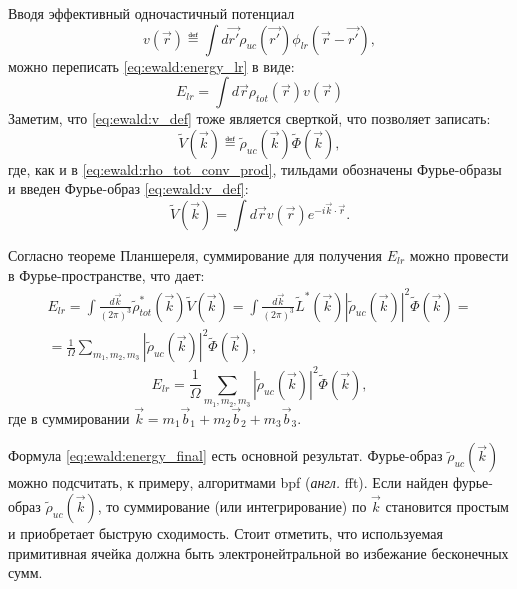 Вводя эффективный одночастичный потенциал
\begin{equation}
    \label{eq:ewald:v_def}
    v(\vec{r}) \eqdef \int d \vec{r'} \rho_{u c}\left(\vec{r'}\right) \phi_{lr}\left(\vec{r}-\vec{r'}\right),
\end{equation}
можно переписать \eqref{eq:ewald:energy_lr} в виде:
\begin{equation}
    \label{eq:ewald:energy_v_rewrite}
    E_{lr}=\int d \vec{r} \rho_{tot}(\vec{r}) v(\vec{r})
\end{equation}
Заметим, что \eqref{eq:ewald:v_def} тоже является сверткой, что позволяет записать:
\begin{equation}
    \label{eq:ewald:v_fourier_conv_prod}
    \tilde{V}(\vec{k}) \eqdef \tilde{\rho}_{uc}(\vec{k}) \tilde{\Phi}(\vec{k}),
\end{equation}
где, как и в \eqref{eq:ewald:rho_tot_conv_prod}, тильдами обозначены Фурье-образы и введен Фурье-образ \eqref{eq:ewald:v_def}:
\begin{equation}
    \label{eq:ewald:v_fourier}
    \tilde{V}(\vec{k})=\int d \vec{r} v(\vec{r}) e^{-i \vec{k} \cdot \vec{r}}.
\end{equation}

Согласно теореме Планшереля, суммирование для получения $E_{lr}$ можно провести в Фурье-пространстве, что дает:
\begin{multline*}
    E_{l r} = \int \frac{d \vec{k}}{(2 \pi)^{3}} \tilde{\rho}_{tot}^{*}(\vec{k}) \tilde{V}(\vec{k})
    = \int \frac{d \vec{k}}{(2 \pi)^{3}} \tilde{L}^{*}(\vec{k})\left|\tilde{\rho}_{u c}(\vec{k})\right|^{2} \tilde{\Phi}(\vec{k}) = \\
    = \frac{1}{\Omega} \sum_{m_{1}, m_{2}, m_{3}}\left|\tilde{\rho}_{u c}(\vec{k})\right|^{2} \tilde{\Phi}(\vec{k}),
\end{multline*}
\begin{equation}
    \label{eq:ewald:energy_final}
    E_{lr} = \frac{1}{\Omega} \sum_{m_{1}, m_{2}, m_{3}}\left|\tilde{\rho}_{u c}(\vec{k})\right|^{2} \tilde{\Phi}(\vec{k}),
\end{equation}
где в суммировании $\vec{k}=m_{1} \vec{b}_{1}+m_{2} \vec{b}_{2}+m_{3} \vec{b}_{3}$.

Формула \eqref{eq:ewald:energy_final} есть основной результат.
Фурье-образ $\tilde{\rho}_{uc} (\vec{k})$ можно подсчитать, к примеру, алгоритмами \acrshort{bpf} (\textit{англ.} \acrshort{fft}).
Если найден фурье-образ $\tilde{\rho}_{uc} (\vec{k})$, то суммирование (или интегрирование) по $\vec{k}$ становится простым и приобретает быструю сходимость.
Стоит отметить, что используемая примитивная ячейка должна быть электронейтральной во избежание бесконечных сумм.

